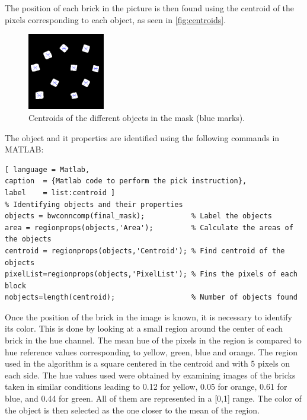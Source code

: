 The position of each brick in the picture is then found using the centroid of the pixels corresponding to each object, as seen in \autoref{fig:centroids}.
%
\begin{figure}[H]
	\includegraphics[width=0.3\textwidth]{figures/centroids.png}
	\caption{Centroids of the different objects in the mask (blue marks).}
	\label{fig:centroids}
\end{figure}

The object and it properties are identified using the following commands in MATLAB:
%
\begin{lstlisting}[ language = Matlab,
caption  = {Matlab code to perform the pick instruction},
label    = list:centroid ]
% Identifying objects and their properties
objects = bwconncomp(final_mask);           % Label the objects
area = regionprops(objects,'Area');         % Calculate the areas of the objects
centroid = regionprops(objects,'Centroid'); % Find centroid of the objects
pixelList=regionprops(objects,'PixelList'); % Fins the pixels of each block
nobjects=length(centroid);                  % Number of objects found
\end{lstlisting}

Once the position of the brick in the image is known, it is necessary to identify its color. This is done by looking at a small region around the center of each brick in the hue channel. The mean hue of the pixels in the region is compared to hue reference values corresponding to yellow, green, blue and orange. The region used in the algorithm is a square centered in the centroid and with 5 pixels on each side. The hue values used were obtained by examining images of the bricks taken in similar conditions leading to 0.12 for yellow, 0.05 for orange, 0.61 for blue, and 0.44 for green. All of them are represented in a [0,1] range. The color of the object is then selected as the one closer to the mean of the region. 

